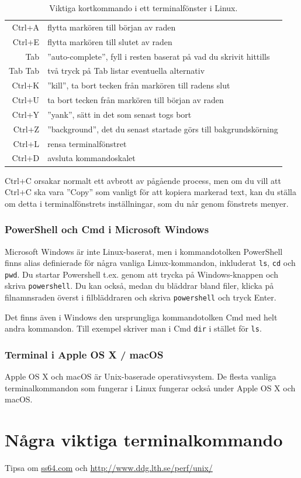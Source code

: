 \begin{table}[H]
\renewcommand{\arraystretch}{1.15}
\begin{tabular}{@{}r | l}
Ctrl+A & flytta markören till början av raden \\
Ctrl+E & flytta markören till slutet av raden \\
Tab & ''auto-complete'', fyll i resten baserat på vad du skrivit hittills \\
Tab Tab & två tryck på Tab listar eventuella alternativ \\
Ctrl+K & ''kill'', ta bort tecken från markören till radens slut\\
Ctrl+U & ta bort tecken från markören till början av raden \\
Ctrl+Y & ''yank'', sätt in det som senast togs bort\\
Ctrl+Z & ''background'', det du senast startade görs till bakgrundskörning\\
Ctrl+L & rensa terminalfönstret\\
Ctrl+D & avsluta kommandoskalet \\
\end{tabular}
    \caption{Viktiga kortkommando i ett terminalfönster i Linux.}
    \label{fig:terminal:shortcuts}
\end{table}

Ctrl+C orsakar normalt ett avbrott av pågående process, men om du vill att Ctrl+C ska vara ''Copy'' som vanligt för att kopiera markerad text, kan du ställa om detta i terminalfönstrets inställningar, som du når genom fönstrets menyer.




 
\subsubsection{PowerShell och Cmd i Microsoft Windows}
Microsoft Windows är inte Linux-baserat, men i kommandotolken PowerShell finns alias definierade för några vanliga Linux-kommandon, inkluderat \texttt{ls}, \texttt{cd} och \texttt{pwd}. Du startar Powershell t.ex. genom att trycka på Windows-knappen och skriva \texttt{powershell}. Du kan också, medan du bläddrar bland filer, klicka på filnamnsraden överst i filbläddraren och skriva \texttt{powershell} och tryck Enter.

Det finns även i Windows den ursprungliga kommandotolken Cmd med helt andra kommandon. Till exempel skriver man i Cmd \texttt{dir} i stället för \texttt{ls}. 



\subsubsection{Terminal i Apple OS X / macOS}
Apple OS X och macOS är Unix-baserade operativsystem. De flesta vanliga terminalkommandon som fungerar i Linux fungerar också under Apple OS X och macOS.

\section{Några viktiga terminalkommando}

Tipsa om \href{http://ss64.com/}{ss64.com} och \url{http://www.ddg.lth.se/perf/unix/}